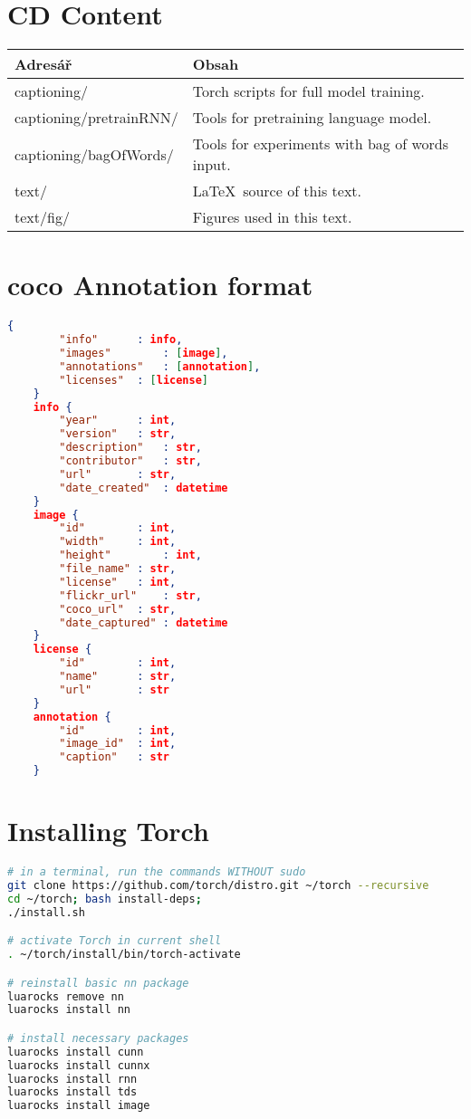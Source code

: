 \chapter{CD Content}

\begin{table}[h]
	\centering
	\renewcommand{\arraystretch}{1.2}
	\begin{tabular}{|l|l|}
		\hline
		Adresář & Obsah  \\
		\hline
		\hline
		captioning/ & Torch scripts for full model training. \\
		captioning/pretrainRNN/ & Tools for pretraining language model. \\
		captioning/bagOfWords/ & Tools for experiments with bag of words input. \\
		text/ & \LaTeX\ source of this text. \\
		text/fig/ & Figures used in this text. \\
		\hline
	\end{tabular}
	\label{tab:cdcontent}
\end{table}

\chapter{\gls{coco} Annotation format} \label{chp:jsonAnnotation}
\begin{lstlisting}[language=json,firstnumber=1]
	{
		"info"		: info,
		"images"		: [image],
		"annotations"	: [annotation],
		"licenses"	: [license]
	}
	info {
		"year"		: int,
		"version"	: str,
		"description"	: str,
		"contributor"	: str,
		"url"		: str,
		"date_created"	: datetime
	}
	image {
		"id"		: int,
		"width"		: int,
		"height"		: int,
		"file_name"	: str,
		"license"	: int,
		"flickr_url"	: str,
		"coco_url"	: str,
		"date_captured"	: datetime
	}
	license {
		"id"		: int,
		"name"		: str,
		"url"		: str
	}
	annotation {
		"id"		: int,
		"image_id"	: int,
		"caption"	: str
	}
\end{lstlisting}

\chapter{Installing Torch}

\begin{lstlisting}[firstnumber=1,breakindent=75pt, language=bash,frame=single]
# in a terminal, run the commands WITHOUT sudo
git clone https://github.com/torch/distro.git ~/torch --recursive
cd ~/torch; bash install-deps;
./install.sh

# activate Torch in current shell
. ~/torch/install/bin/torch-activate

# reinstall basic nn package
luarocks remove nn
luarocks install nn

# install necessary packages
luarocks install cunn
luarocks install cunnx
luarocks install rnn
luarocks install tds
luarocks install image

\end{lstlisting}

